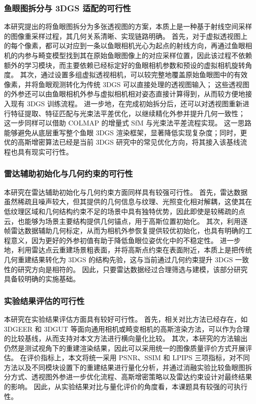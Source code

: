 \subsubsection{鱼眼图拆分与 3DGS 适配的可行性}

本研究提出的将鱼眼图拆分为多张透视图的方案，本质上是一种基于射线空间采样的图像重采样过程，其几何关系清晰、实现链路明确。
首先，对于虚拟透视图上的每个像素，都可以对应到一条以鱼眼相机光心为起点的射线方向，再通过鱼眼相机的内参与畸变模型找到其在原始鱼眼图像上的对应采样位置，因此该过程不依赖额外的学习模块，而主要依赖已经标定好的鱼眼相机参数和预设的虚拟相机旋转角度。
其次，通过设置多组虚拟透视相机，可以较完整地覆盖原始鱼眼图中的有效像素，并将鱼眼观测转化为传统 3DGS 可以直接处理的透视图输入；
这些透视图的外参还可以由鱼眼相机外参与虚拟相机相对姿态直接计算得到，从而较方便地接入现有 3DGS 训练流程。
进一步地，在完成初始拆分后，还可以对透视图重新进行特征提取、特征匹配与光束法平差优化，以继续精化外参并提升几何一致性；
这一步同样可以借助 COLMAP 的增量式 SfM 与光束法平差流程实现\cite{schonberger2016sfm}。
这一思路能够避免从底层重写整个鱼眼 3DGS 渲染框架，显著降低实现复杂度；同时，更优的高斯增密算法已经是当前 3DGS 研究中的常见优化方向，将其接入该基线流程也具有现实可行性。

\subsubsection{雷达辅助初始化与几何约束的可行性}

本研究在雷达辅助初始化与几何约束方面同样具有较强可行性。
首先，雷达数据虽然稀疏且噪声较大，但其提供的几何信息与纹理、光照变化相对解耦，这使其在低纹理区域和几何结构约束不足的场景中具有独特优势，因此即使是较稀疏的点云，也能够为场景主要结构提供几何锚点，用于高斯位置初始化。
其次，利用逐帧雷达数据辅助几何标定，从而为相机外参恢复提供较优初始化，也具有明确的工程意义，因为更好的外参初值有助于降低鱼眼位姿优化中的不稳定性。
进一步地，利用雷达点云重建场景粗表面，并将高斯点约束在表面附近，本质上是把传统几何重建结果转化为 3DGS 的结构先验，这与当前通过几何约束提升 3DGS 一致性的研究方向是相符的。
因此，只要雷达数据经过合理筛选与建模，该部分研究具备较明确的实施基础。

\subsubsection{实验结果评估的可行性}

本研究在实验结果评估方面具有较好可行性。
首先，相关对比方法已经存在，如 3DGEER 和 3DGUT 等面向通用相机或畸变相机的高斯渲染方法，可以作为合理的比较基线，从而支持对本文方法进行横向量化比较。
其次，本研究的方法输出仍然是测试视角下的重建渲染结果，因此可以采用统一的图像质量评价方式开展评估。
在评价指标上，本文将统一采用 PSNR、SSIM 和 LPIPS 三项指标，对不同方法以及不同模块设置下的重建结果进行量化分析，并通过消融实验比较鱼眼图拆分方式、透视图外参进一步优化流程、高斯增密策略以及雷达约束设计对最终结果的影响。
因此，从实验结果对比与量化评价的角度看，本课题具有较强的可执行性。
